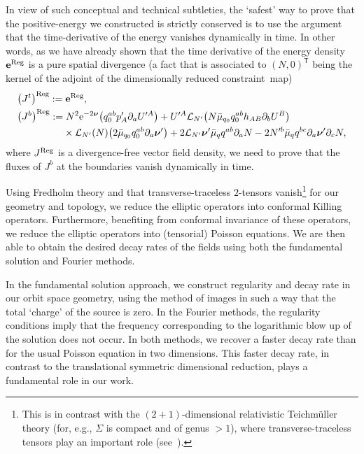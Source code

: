 \documentclass[11pt]{article}
\numberwithin{equation}{section}
\def\ptl{\partial}%
\def\mbo#1{\boldsymbol{#1}}%
\numberwithin{equation}{section}
\begin{document}
In view of such conceptual and technical subtleties, the `safest' way to prove that the positive-energy  we constructed is strictly conserved is to use the argument that the time-derivative of the energy  vanishes dynamically in time. In other words, as we have already shown that the time derivative of the energy density $\mathbf{e}^{{\rm Reg}}$ is a pure spatial divergence (a fact that is associated to $(N, 0)^{\mathsf{T}}$ being the kernel of the adjoint of the dimensionally reduced constraint~map)
\begin{align*}
&\bigl(J^ t\bigr)^ {{\rm Reg}}:= \mathbf{e}^{{\rm Reg}}, \notag\\
&\bigl(J^b\bigr)^{{\rm Reg}}:= N^2 {\rm e}^{-2 \mbo{\nu}}\bigl(q_{0}^{ab} p'_A \ptl_a U'^A\bigr) + U'^A \mathcal{L}_{N'} \bigl(N\bar{\mu}_{q_0} q^{ab}_0 h_{AB} \ptl_b U^B\bigr) \notag\\
&\hphantom{\bigl(J^b\bigr)^{{\rm Reg}}:=}{}\times \mathcal{L}_{N'} (N) \bigl(2 \bar{\mu}_{q_0} q_{0}^{ab} \ptl_a \mbo{\nu}'\bigr) + 2 \mathcal{L}_{N'} \mbo{\nu}' \bar{\mu}_q q^{ab} \ptl_a N - 2 N'^b \bar{\mu}_q q^{bc} \ptl_a \mbo{\nu}' \ptl_c N,
\end{align*}
where $J^{{\rm Reg}}$ is a divergence-free vector field density, we need to prove that the fluxes of $J^b$ at the boundaries vanish dynamically in time.

Using Fredholm theory and that transverse-traceless $2$-tensors
vanish\footnote{This is in contrast with the $(2+1)$-dimensional relativistic Teichm\"uller theory (for, e.g., $\Sigma$ is compact and of genus $>1$), where transverse-traceless tensors play an important role (see~\cite{Moncrief_2007}).} for our geometry and topology, we reduce the elliptic operators into conformal Killing operators. Furthermore, benefiting from conformal invariance of these operators, we reduce the elliptic operators into (tensorial) Poisson equations. We are then able to obtain the desired decay rates of the fields using both the fundamental solution and Fourier methods.

In the fundamental solution approach, we construct regularity and decay rate in our orbit space geometry, using the method of images in such a way that the total `charge' of the source is zero. In the Fourier methods, the regularity conditions imply that the frequency corresponding to the logarithmic blow up of the solution does not occur. In both methods, we recover a faster decay rate than for the usual Poisson equation in two dimensions. This faster decay rate, in contrast to the translational symmetric dimensional reduction, plays a fundamental role in our work.
\end{document}
